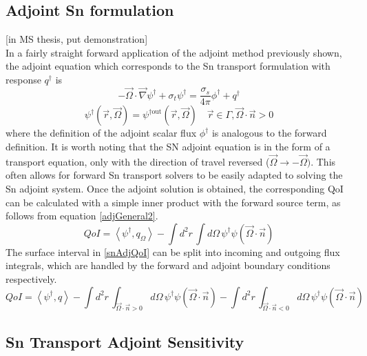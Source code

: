 \documentclass{article}
\newcommand{\vr}{\vec{r}}
\newcommand{\vO}{\vec{\Omega}}
\newcommand{\bra}{\left\langle}
\newcommand{\ket}{\right\rangle}
\newcommand{\vgrad}{\vec{\nabla}}
\newcommand{\sigt}{\sigma_t}
\newcommand{\sigs}{\sigma_s}
\newcommand{\angSource}{q_\Omega}
\newcommand{\angResp}{q^\dag}
\begin{document}
\subsection{Adjoint Sn formulation}
[in MS thesis, put demonstration]\\

In a fairly straight forward application of the adjoint method previously shown, the adjoint equation which corresponds to the Sn transport formulation with response $\angResp$ is
\begin{equation}
\label{snAdj}
- \vO \cdot \vgrad \psi^\dag + \sigt \psi^\dag = \frac{\sigs}{4 \pi} \phi^\dag + \angResp
\end{equation}
%
\begin{equation}
\psi^\dag(\vr,\vO) = \psi^{\dag \text{out}}(\vr,\vO) \quad \vr \in \Gamma, \vO \cdot \vec{n} > 0
\end{equation}
where the definition of the adjoint scalar flux $\phi^\dag$ is analogous to the forward definition. It is worth noting that the SN adjoint equation is in the form of a transport equation, only with the direction of travel reversed ($\vO \to -\vO)$. This often allows for forward Sn transport solvers to be easily adapted to solving the Sn adjoint system. Once the adjoint solution is obtained, the corresponding QoI can be calculated with a simple inner product with the forward source term, as follows from equation \ref{adjGeneral2}. 
%
\begin{equation}
\label{snAdjQoI}
QoI = \bra \psi^\dag , \angSource \ket - \int d^2 r \, \int d  \Omega \, \psi^\dag \psi ( \vO \cdot \vec{n} )
\end{equation}
%
The surface interval in \ref{snAdjQoI} can be split into incoming and outgoing flux integrals, which are handled by the forward and adjoint boundary conditions respectively. 
%
\begin{equation}
QoI = \bra \psi^\dag , q \ket - \int d^2 r \, \int_{\vO \cdot \vec{n} >0} d  \Omega \, \psi^\dag \psi ( \vO \cdot \vec{n} ) - \int d^2 r \, \int_{\vO \cdot \vec{n} <0} d  \Omega \, \psi^\dag \psi ( \vO \cdot \vec{n} )
\end{equation}

\subsection{Sn Transport Adjoint Sensitivity}
\end{document}
